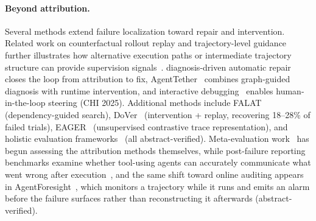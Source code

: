 \paragraph*{Beyond attribution.}
Several methods extend failure localization toward repair and intervention. Related work on counterfactual rollout replay and trajectory-level guidance further illustrates how alternative execution paths or intermediate trajectory structure can provide supervision signals~\cite{li2026counterfactualrolloutreplayforkable,jiang2026bridgingreasoningtrajectoriesonpolicy}.  diagnosis-driven automatic repair~\cite{diagrepair2026} closes the loop from attribution to fix, AgentTether~\cite{agenttether2026} combines graph-guided diagnosis with runtime intervention, and interactive debugging~\cite{interactivedebug2025} enables human-in-the-loop steering (CHI 2025). Additional methods include FALAT~\cite{falat2026} (dependency-guided search), DoVer~\cite{dover2026} (intervention + replay, recovering 18--28\% of failed trials), EAGER~\cite{eager2026} (unsupervised contrastive trace representation), and holistic evaluation frameworks~\cite{holisticeval2026} (all abstract-verified). Meta-evaluation work~\cite{whwhpro2026} has begun assessing the attribution methods themselves, while post-failure reporting benchmarks examine whether tool-using agents can accurately communicate what went wrong after execution~\cite{zhu2026failure}, and the same shift toward online auditing appears in AgentForesight~\cite{agentforesight2026}, which monitors a trajectory while it runs and emits an alarm before the failure surfaces rather than reconstructing it afterwards (abstract-verified).

